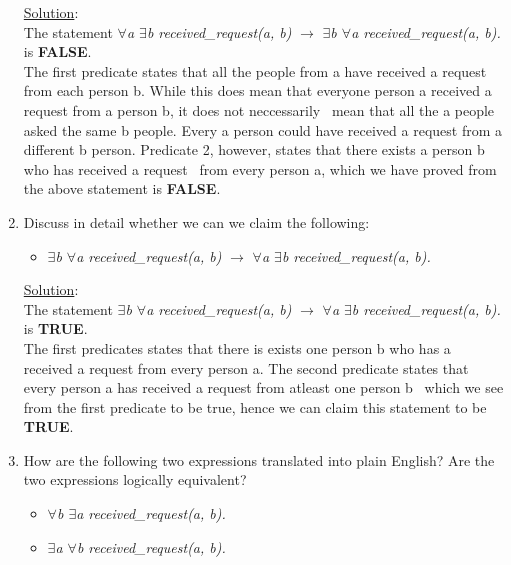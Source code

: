\begin{enumerate}
    \noindent \underline{Solution}:\\ The statement \emph{$\forall$a $\exists$b received\_request(a, b)} $\rightarrow$ \emph{$\exists$b $\forall$a received\_request(a, b).} is \textbf{FALSE}.\\
    The first predicate states that all the people from a have received a request from each person b. While this does mean that everyone person a received a request from a person b, it does not neccessarily \
    mean that all the a people asked the same b people. Every a person could have received a request from a different b person. Predicate 2, however, states that there exists a person b who has received a request \
    from every person a, which we have proved from the above statement is \textbf{FALSE}.
  
  \item Discuss in detail whether we can we claim the following:\
    \begin{itemize}
      \item[] \emph{$\exists$b $\forall$a received\_request(a, b)} $\rightarrow$ \emph{$\forall$a $\exists$b received\_request(a, b).}
    \end{itemize}

  \noindent \underline{Solution}:\\ The statement \emph{$\exists$b $\forall$a received\_request(a, b)} $\rightarrow$ \emph{$\forall$a $\exists$b received\_request(a, b).} is \textbf{TRUE}. \\
  The first predicates states that there is exists one person b who has a received a request from every person a. The second predicate states that every person a has received a request from atleast one person b \
  which we see from the first predicate to be true, hence we can claim this statement to be \textbf{TRUE}.

  \item How are the following two expressions translated into plain English? Are the two
  expressions logically equivalent?
    \begin{itemize}
      \item \emph{$\forall$b $\exists$a received\_request(a, b).}
      \item \emph{$\exists$a $\forall$b received\_request(a, b).}
    
    \end{itemize}


\end{enumerate}
